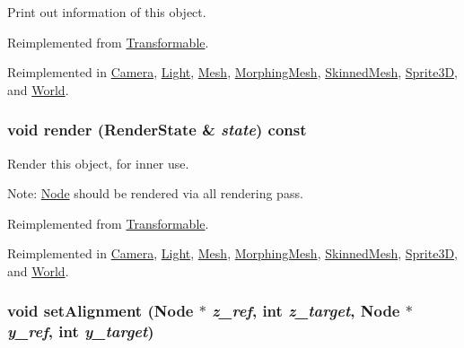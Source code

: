 Print out information of this object. 

Reimplemented from \hyperlink{classm3g_1_1Transformable_6fea17fa1532df3794f8cb39cb4f911f}{Transformable}.

Reimplemented in \hyperlink{classm3g_1_1Camera_6fea17fa1532df3794f8cb39cb4f911f}{Camera}, \hyperlink{classm3g_1_1Light_6fea17fa1532df3794f8cb39cb4f911f}{Light}, \hyperlink{classm3g_1_1Mesh_6fea17fa1532df3794f8cb39cb4f911f}{Mesh}, \hyperlink{classm3g_1_1MorphingMesh_6fea17fa1532df3794f8cb39cb4f911f}{MorphingMesh}, \hyperlink{classm3g_1_1SkinnedMesh_6fea17fa1532df3794f8cb39cb4f911f}{SkinnedMesh}, \hyperlink{classm3g_1_1Sprite3D_6fea17fa1532df3794f8cb39cb4f911f}{Sprite3D}, and \hyperlink{classm3g_1_1World_6fea17fa1532df3794f8cb39cb4f911f}{World}.\hypertarget{classm3g_1_1Node_8babc8a79b78615da51161e94029eea9}{
\subsubsection[{render}]{\setlength{\rightskip}{0pt plus 5cm}void render ({\bf RenderState} \& {\em state}) const}}
\label{classm3g_1_1Node_8babc8a79b78615da51161e94029eea9}


Render this object, for inner use.

Note: \hyperlink{classm3g_1_1Node}{Node} should be rendered via all rendering pass. 

Reimplemented from \hyperlink{classm3g_1_1Transformable_8babc8a79b78615da51161e94029eea9}{Transformable}.

Reimplemented in \hyperlink{classm3g_1_1Camera_8babc8a79b78615da51161e94029eea9}{Camera}, \hyperlink{classm3g_1_1Light_8babc8a79b78615da51161e94029eea9}{Light}, \hyperlink{classm3g_1_1Mesh_8babc8a79b78615da51161e94029eea9}{Mesh}, \hyperlink{classm3g_1_1MorphingMesh_8babc8a79b78615da51161e94029eea9}{MorphingMesh}, \hyperlink{classm3g_1_1SkinnedMesh_8babc8a79b78615da51161e94029eea9}{SkinnedMesh}, \hyperlink{classm3g_1_1Sprite3D_8babc8a79b78615da51161e94029eea9}{Sprite3D}, and \hyperlink{classm3g_1_1World_8babc8a79b78615da51161e94029eea9}{World}.\hypertarget{classm3g_1_1Node_dd1627aba90e63c166ecd3d7463d735a}{
\subsubsection[{setAlignment}]{\setlength{\rightskip}{0pt plus 5cm}void setAlignment ({\bf Node} $\ast$ {\em z\_\-ref}, \/  int {\em z\_\-target}, \/  {\bf Node} $\ast$ {\em y\_\-ref}, \/  int {\em y\_\-target})}}
\label{classm3g_1_1Node_dd1627aba90e63c166ecd3d7463d735a}


